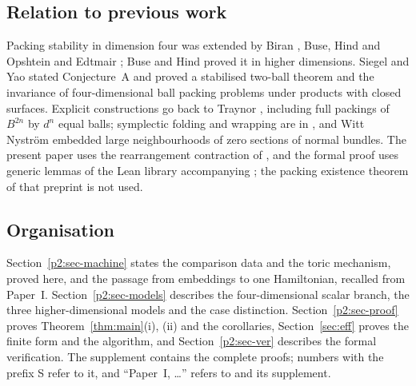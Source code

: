 \subsection{Relation to previous work}\label{p2:sec-intro-prior}

Packing stability in dimension four was extended by Biran \cite{Biran1999}, Buse, Hind and Opshtein
\cite{BuseHind2011,BuseHind2013,BuseHindOpshtein2016} and Edtmair \cite{Edtmair2025}; Buse and Hind proved it in higher
dimensions. Siegel and Yao
\cite{SiegelYao2025} stated Conjecture~A and proved a stabilised two-ball theorem and the invariance of
four-dimensional ball packing problems under products with closed surfaces. Explicit constructions go back to
Traynor \cite{Traynor1995}, including full packings of $B^{2n}$ by $d^n$ equal balls; symplectic folding and wrapping
are in \cite{SchlenkHand,SchlenkBook,Schlenk2018}, and Witt Nystr\"om \cite{WittNystrom2024} embedded large
neighbourhoods of zero sections of normal bundles. The present paper uses the rearrangement contraction of
\cite[\S2]{OpenAI2026}, and the formal proof uses generic lemmas of the Lean library accompanying
\cite{OpenAI2026}; the packing existence theorem of that preprint is not used.

\subsection{Organisation}\label{p2:sec-intro-organisation}

Section~\ref{p2:sec-machine} states the comparison data and the toric mechanism, proved here, and the passage from
embeddings to one Hamiltonian, recalled from Paper~I. Section~\ref{p2:sec-models} describes the four-dimensional
scalar branch, the three higher-dimensional models and the case distinction. Section~\ref{p2:sec-proof} proves
Theorem~\ref{thm:main}(i), (ii) and the corollaries, Section~\ref{sec:eff} proves the finite form and the algorithm, and
Section~\ref{p2:sec-ver} describes the formal verification. The supplement contains the complete proofs; numbers with
the prefix S refer to it, and ``Paper~I, \dots'' refers to \cite{PaperI} and its supplement.
